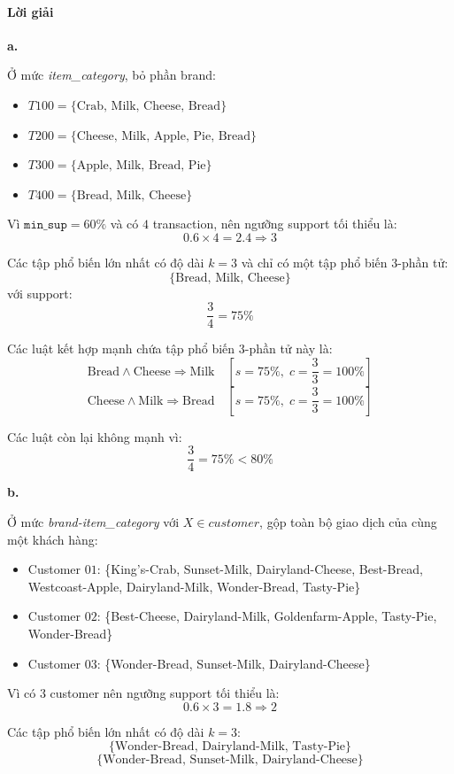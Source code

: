 \paragraph{Lời giải}
\noindent \textbf{a.}

Ở mức \textit{item\_category}, bỏ phần brand:
\begin{itemize}
    \item $T100=\{\text{Crab, Milk, Cheese, Bread}\}$
    \item $T200=\{\text{Cheese, Milk, Apple, Pie, Bread}\}$
    \item $T300=\{\text{Apple, Milk, Bread, Pie}\}$
    \item $T400=\{\text{Bread, Milk, Cheese}\}$
\end{itemize}

Vì $\texttt{min\_sup}=60\%$ và có $4$ transaction, nên ngưỡng support tối thiểu là:
\[
    0.6 \times 4 = 2.4 \Rightarrow 3
\]

Các tập phổ biến lớn nhất có độ dài $k=3$ và chỉ có một tập phổ biến $3$-phần tử:
\[
    \{\text{Bread, Milk, Cheese}\}
\]
với support:
\[
    \frac{3}{4}=75\%
\]

Các luật kết hợp mạnh chứa tập phổ biến $3$-phần tử này là:
\[
    \text{Bread} \land \text{Cheese} \Rightarrow \text{Milk}
    \quad [s=75\%,\; c=\frac{3}{3}=100\%]
\]
\[
    \text{Cheese} \land \text{Milk} \Rightarrow \text{Bread}
    \quad [s=75\%,\; c=\frac{3}{3}=100\%]
\]

Các luật còn lại không mạnh vì:
\[
    \frac{3}{4}=75\% < 80\%
\]

\bigskip

\noindent \textbf{b.}

Ở mức \textit{brand-item\_category} với $X \in customer$, gộp toàn bộ giao dịch của cùng một khách hàng:
\begin{itemize}
    \item Customer $01$: \{King's-Crab, Sunset-Milk, Dairyland-Cheese, Best-Bread, Westcoast-Apple, Dairyland-Milk, Wonder-Bread, Tasty-Pie\}
    \item Customer $02$: \{Best-Cheese, Dairyland-Milk, Goldenfarm-Apple, Tasty-Pie, Wonder-Bread\}
    \item Customer $03$: \{Wonder-Bread, Sunset-Milk, Dairyland-Cheese\}
\end{itemize}

Vì có $3$ customer nên ngưỡng support tối thiểu là:
\[
    0.6 \times 3 = 1.8 \Rightarrow 2
\]

Các tập phổ biến lớn nhất có độ dài $k=3$:
\[
    \{\text{Wonder-Bread, Dairyland-Milk, Tasty-Pie}\}
\]
\[
    \{\text{Wonder-Bread, Sunset-Milk, Dairyland-Cheese}\}
\]

